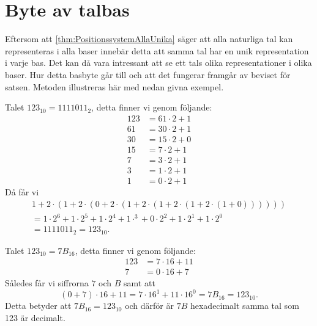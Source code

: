 \section{Byte av talbas}
Eftersom att \cref{thm:PositionssystemAllaUnika} säger att alla
naturliga tal kan representeras i alla baser innebär detta att samma tal har
en unik representation i varje bas.
Det kan då vara intressant att se ett tals olika representationer i olika
baser.
Hur detta basbyte går till och att det fungerar framgår av beviset för satsen.
Metoden illustreras här med nedan givna exempel.
\begin{example}
  Talet \(123_{10} = 1111011_2\), detta finner vi genom följande:
  \begin{align*}
    123 &= 61\cdot 2 + 1 \\
    61 &= 30\cdot 2 + 1 \\
    30 &= 15\cdot 2 + 0 \\
    15 &= 7\cdot 2 + 1 \\
    7 &= 3\cdot 2 + 1 \\
    3 &= 1\cdot 2 + 1 \\
    1 &= 0\cdot 2 + 1
  \end{align*}
  Då får vi
  \begin{multline}
    1 + 2\cdot (1 + 2\cdot (0 + 2\cdot (1 + 2\cdot (1 + 2\cdot (1 + 2\cdot
      (1 + 0)))))) \\
    = 1\cdot 2^6 + 1\cdot 2^5 + 1\cdot 2^4 + 1\cdot^3 + 0\cdot 2^2 +
      1\cdot 2^1 + 1\cdot 2^0 \\
    = 1111011_2 = 123_{10}.
  \end{multline}
\end{example}
\begin{example}
  Talet \(123_{10} = 7B_{16}\), detta finner vi genom följande:
  \begin{align*}
    123 &= 7\cdot16 + 11 \\
    7 &= 0\cdot16 + 7
  \end{align*}
  Således får vi siffrorna \(7\) och \(B\) samt att
  \begin{equation*}
    (0+7)\cdot16 + 11 = 7\cdot16^1 + 11\cdot16^0 = 7B_{16} = 123_{10}.
  \end{equation*}
  Detta betyder att \(7B_{16} = 123_{10}\) och därför är \(7B\) hexadecimalt
  samma tal som 123 är decimalt.
\end{example}

